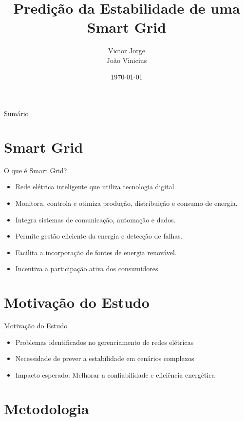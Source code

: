 \documentclass{beamer}
\title{Predição da Estabilidade de uma Smart Grid}
\author{Victor Jorge  \\ João Vinicius }
\date{\today}
\begin{document}
\begin{frame}
    \titlepage
\end{frame}

\begin{frame}{Sumário}
    \tableofcontents
\end{frame}

\section{Smart Grid}

\begin{frame}{O que é Smart Grid?}

    \begin{itemize}
        \item Rede elétrica inteligente que utiliza tecnologia digital.
        \item Monitora, controla e otimiza produção, distribuição e consumo de energia.
        \item Integra sistemas de comunicação, automação e dados.
        \item Permite gestão eficiente da energia e detecção de falhas.
        \item Facilita a incorporação de fontes de energia renovável.
        \item Incentiva a participação ativa dos consumidores.
    \end{itemize}

\end{frame}

\section{Motivação do Estudo}

\begin{frame}{Motivação do Estudo}
    \begin{itemize}
        \item Problemas identificados no gerenciamento de redes elétricas
        \item Necessidade de prever a estabilidade em cenários complexos
        \item Impacto esperado: Melhorar a confiabilidade e eficiência energética
    \end{itemize}
\end{frame}

\section{Metodologia}
\end{document}
